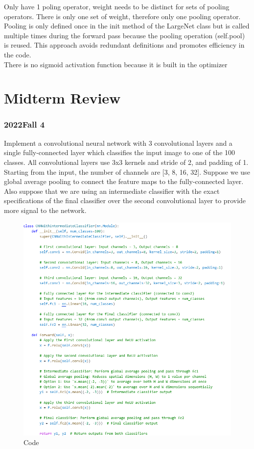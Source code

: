 \documentclass[11pt, english]{article}
\begin{document}
Only have 1 poling operator, weight needs to be distinct for sets of pooling operators. There is only one set of weight, therefore only one pooling operator.\\
Pooling is only defined once in the init method of the LargeNet class but is called multiple times during the forward pass because the pooling operation (self.pool) is reused. This approach avoids redundant definitions and promotes efficiency in the code.\\
There is no sigmoid activation function because it is built in the optimizer

\section{Midterm Review}
\subsubsection{2022Fall 4}
Implement a convolutional neural network with 3 convolutional layers and a single fully-connected layer which classifies the input image to one of the 100 classes. All convolutional layers use 3x3 kernels and stride of 2, and padding of 1. Starting from the input, the number of channels are [3, 8, 16, 32]. Suppose we use global average pooling to connect the feature maps to the fully-connected layer. Also suppose that we are using an intermediate classifier with the exact specifications of the final classifier over the second convolutional layer to provide more signal to the network. 
\begin{figure}
    \centering
    \includegraphics[width=1\linewidth]{question20224.png}
    \caption{Code}
    \label{fig:enter-label}
\end{figure}
\end{document}
